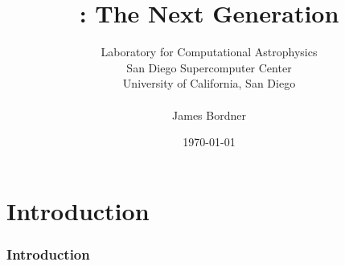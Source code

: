 \documentclass{beamer}
\title[\enzo: The Next Generation]
      {\enzo: The Next Generation}
\author[James Bordner]{\small Laboratory for Computational Astrophysics \\ San Diego Supercomputer Center \\ University of California, San Diego \\ \ \\ James Bordner}
\date{\today}
\begin{document}



% 

\part{Introduction}

\section{Introduction}


\end{document}
